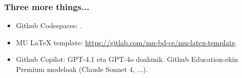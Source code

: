 \documentclass[lang=eu,biz=pls,aspectratio=169,handout]{mupresentation}
\begin{document}
\begin{frame}
  \frametitle{Three more things...}
  \begin{itemize}
    \item Github Codespaces: .
    \item MU LaTeX template: \url{https://gitlab.com/mu-bd-ce/mu-latex-template}.
    \item Github Copilot: GPT-4.1 eta GPT-4o doahinik. Github Education-ekin Premium modeloak (Claude Sonnet 4, ...).
  \end{itemize}
\end{frame}

\end{document}
